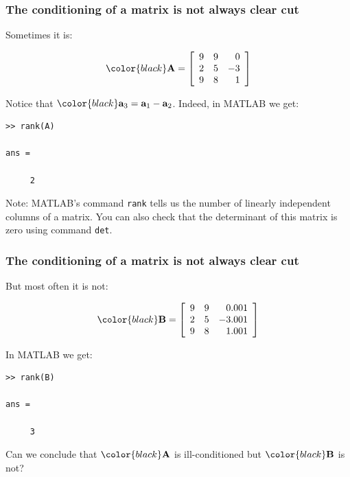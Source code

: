 \documentclass[compress]{beamer}
\newcommand{\black}[1]{{\color{black}#1}}
\newcommand{\beq}[1]{\[\black{#1}\]}
\begin{document}
\begin{frame}[fragile]
\frametitle{The conditioning of a matrix is not always clear cut}

Sometimes it is:

\beq{
\A = 
\left[
	\begin{array}{rrr}
	9 & 9 & 0\\
	2 & 5 & -3\\
	9 & 8 & 1\\
	\end{array}
\right]
}

Notice that $\black{\a_3=\a_1-\a_2}$. Indeed, in MATLAB we get:

\begin{verbatim}
>> rank(A)

ans =

     2
\end{verbatim}

\tiny{\black{Note:} MATLAB's command \verb|rank| tells us the number of linearly independent columns of a matrix. You can also check that the determinant of this matrix is zero using command \verb|det|.} 

\end{frame}


\begin{frame}[fragile]
\frametitle{The conditioning of a matrix is not always clear cut}

But most often it is not:

\beq{
\B = 
\left[
	\begin{array}{rrr}
	9 & 9 & 0.001\\
	2 & 5 & -3.001\\
	9 & 8 & 1.001\\
	\end{array}
\right]
}

In MATLAB we get:

\begin{verbatim}
>> rank(B)

ans =

     3
\end{verbatim}

Can we conclude that $\black{\A}$  is ill-conditioned but $\black{\B}$ is not?


\end{frame}
\end{document}

